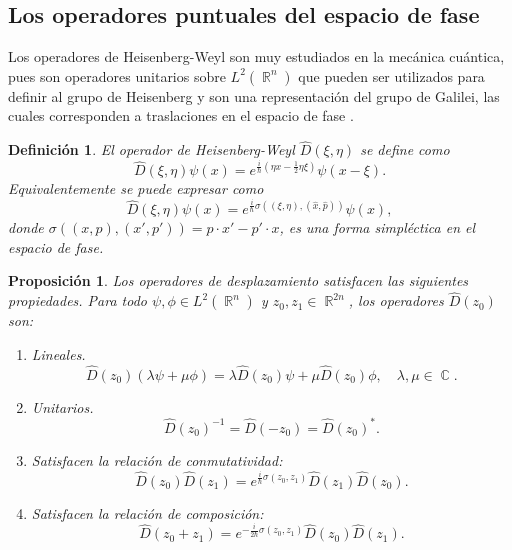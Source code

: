 \documentclass[a4paper,11pt]{report}
\DeclareMathOperator{\R}{\mathbb{R}}
\DeclareMathOperator{\C}{\mathbb{C}}
\newtheorem{definition}{Definición}
\newtheorem{proposition}{Proposición}
\begin{document}
  \subsection{Los operadores puntuales del espacio de fase}

  Los operadores de Heisenberg-Weyl son muy estudiados en la
  mecánica cuántica, pues son operadores unitarios sobre
  $L^2(\R^{n})$ que pueden ser utilizados para definir al
  grupo de Heisenberg y son una representación del grupo de
  Galilei, las cuales corresponden a traslaciones en el
  espacio de fase \cite{degosson2011}.
  \begin{definition}
    El operador de Heisenberg-Weyl $\hat{D}(\xi,\eta)$ se
    define como
    \begin{equation}
      \hat{D}(\xi,\eta)\psi(x)
      = e^{\frac{i}{\hbar} (\eta x - \frac{1}{2} \eta
      \xi)}\psi(x - \xi).
    \end{equation} 
    Equivalentemente se puede expresar como
    \begin{equation}
      \hat{D}(\xi,\eta)\psi(x)
      = e^{\frac{i}{\hbar} \sigma((\xi,\eta),
      (\hat{x},\hat{p}))}\psi(x),
    \end{equation} 
    donde $\sigma((x,p),(x',p')) = p \cdot x' - p' \cdot x$,
    es una forma simpléctica en el espacio de fase.
  \end{definition}
  \begin{proposition}
    \label{prop:HW-ops-props}
    Los operadores de desplazamiento satisfacen las
    siguientes propiedades. Para todo $\psi,\phi \in
    L^2(\R^{n})$ y $z_0,z_1 \in \R^{2n}$, los operadores
    $\hat D(z_0)$ son:
    \begin{enumerate}
      \item Lineales.
        \begin{equation}
          \hat D(z_0)(\lambda \psi + \mu \phi)
          = \lambda \hat D(z_0) \psi + \mu \hat D(z_0)\phi,
          \quad
          \lambda, \mu \in \C.
        \end{equation}
      \item Unitarios.
        \begin{equation}
          \hat D(z_0)^{-1}
          = \hat D(-z_0)
          = \hat D(z_0)^{*}.
        \end{equation}
      \item Satisfacen la relación de conmutatividad:
        \begin{equation}
          \hat{D}(z_0)\hat{D}(z_1)
          = e^{\frac{i}{\hbar} \sigma(z_0,z_1)}
          \hat{D}(z_1)\hat{D}(z_0).
        \end{equation}
      \item Satisfacen la relación de composición:
        \begin{equation}
          \hat D(z_0+z_1)
          = e^{-\frac{i}{2\hbar} \sigma(z_0,z_1)}\hat D(z_0)
          \hat D(z_1).
        \end{equation}
    \end{enumerate}
  \end{proposition}
\end{document}
